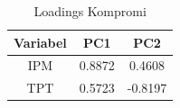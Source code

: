 \begin{table}[H]
\centering
\caption{Loadings Kompromi} \label{tab:loadings}
\begin{tabular}{|c|c|c|}
\hline
\textbf{Variabel} & \textbf{PC1} & \textbf{PC2} \\
\hline
IPM & 0.8872 & 0.4608 \\
TPT & 0.5723 & -0.8197 \\
\hline
\end{tabular}
\end{table}